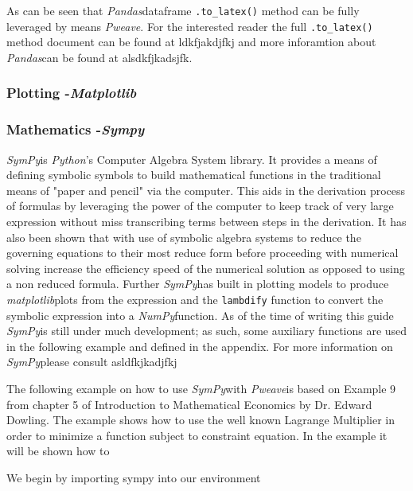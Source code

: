 \documentclass[a4paper,11pt,final]{article}
\newcommand{\pweave}{\emph{Pweave}\space}
\newcommand{\pandas}{\emph{Pandas}\space}
\newcommand{\sympy}{\emph{SymPy}\space}
\newcommand{\mpl}{\emph{matplotlib}\space}
\newcommand{\np}{\emph{NumPy}\space}
\begin{document}
\vspace{.5cm}


        As can be seen that \pandas dataframe \texttt{.to\_latex()} method can be fully leveraged by means \pweave. For the interested reader the full \texttt{.to\_latex()} method document can be found at ldkfjakdjfkj and more inforamtion about \pandas can be found at alsdkfjkadsjfk.
          
          
                   






     \subsubsection{Plotting -\emph{Matplotlib}}
     \subsubsection{Mathematics -\emph{Sympy}}
     	\sympy is \emph{Python}'s Computer Algebra System library. It provides a means of defining symbolic symbols to build mathematical functions  in the traditional means of "paper and pencil" via the computer. This aids in the derivation process of formulas by leveraging the power of the computer to keep track of very large expression without miss transcribing terms between steps in the derivation. It has also been shown that with use of symbolic algebra systems to reduce the governing equations to their most reduce form before proceeding with numerical solving increase the efficiency speed of the numerical solution as opposed to using a non reduced formula. Further \sympy has built in plotting models to produce \mpl plots from the expression and the \texttt{lambdify} function to convert the symbolic expression into a \np function. As of the time of writing this guide \sympy is still under much development; as such, some auxiliary functions are used in the following example and defined in the appendix. For more information on \sympy please consult asldfkjkadjfkj

		The following example on how to use \sympy with \pweave is based on Example 9 from chapter 5 of Introduction to Mathematical Economics by Dr. Edward Dowling. The example shows how to use the well known Lagrange Multiplier in order to minimize a function subject to constraint equation. In the example it will be shown how to



		We begin by importing sympy into our environment
\end{document}
